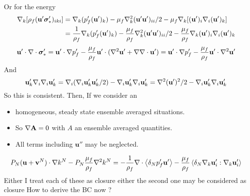 Or for the energy
\begin{align*}
    \mathbf{\nabla}_k [\rho_f (\textbf{u}' \bm\sigma_*')_{iki}]
    &=
    \mathbf{\nabla}_k (p_f'(\textbf{u}')_k  )
    - \mu_f \mathbf{\nabla}_k^2 (\textbf{u}'\textbf{u}')_{ii}/2
    - \mu_f\mathbf{\nabla}_k[ (\textbf{u}')_i \mathbf{\nabla}_i (\textbf{u}')_k]\\
    &=
    \frac{1}{\rho_f} \mathbf{\nabla}_k (p_f'(\textbf{u}')_k  )
    - \frac{\mu_f}{\rho_f}\mathbf{\nabla}_k^2 (\textbf{u}'\textbf{u}')_{ii}/2
    - \frac{\mu_f}{\rho_f}\mathbf{\nabla}_k (\textbf{u}')_i \mathbf{\nabla}_i (\textbf{u}')_k\\
\end{align*}
\begin{equation}
    \textbf{u}'\cdot\mathbf{\nabla}\cdot\bm\sigma'_*
    = 
    \textbf{u}'\cdot \mathbf{\nabla} p_f'
    - \frac{\mu_f}{\rho_f} \textbf{u}'\cdot (\mathbf{\nabla}^2 \textbf{u}' + \mathbf{\nabla}\mathbf{\nabla}\cdot \textbf{u}')
    =
    \textbf{u}'\cdot \mathbf{\nabla} p_f'
    - \frac{\mu_f}{\rho_f} \textbf{u}'\cdot \mathbf{\nabla}^2 \textbf{u}'
\end{equation}
And 
\begin{equation}
    \textbf{u}'_k \mathbf{\nabla}_i \mathbf{\nabla}_i \textbf{u}'_k
    =
   \mathbf{\nabla}_i ( \mathbf{\nabla}_i \textbf{u}'_k\textbf{u}'_k /2)
   - \mathbf{\nabla}_i \textbf{u}'_k \mathbf{\nabla}_i \textbf{u}'_k
   =
   \mathbf{\nabla}^2 (\textbf{u}')^2/2
   - \mathbf{\nabla}_i \textbf{u}'_k \mathbf{\nabla}_i \textbf{u}'_k
\end{equation}
So this is consistent. 
Then, 
If we consider an 
\begin{itemize}
    \item homogeneous, steady state ensemble averaged situations. 
    \item So $\mathbf{\nabla} \textbf{A} = 0$ with $A$ an ensemble averaged quantities. 
    \item All terms including $\textbf{u}''$ may be neglected. 
\end{itemize}

\begin{equation*}
    P_N(\textbf{u}+ \textbf{v}^N ) \cdot\mathbf{\nabla} k^N 
    -P_N \frac{\mu_f}{\rho_f} \mathbf{\nabla}^2k^N
    =
    -\frac{1}{\rho_f}\mathbf{\nabla}\cdot\left<\delta_N p_f'\textbf{u}'\right>
    -\frac{\mu_f}{\rho_f} \left<\delta_N \mathbf{\nabla}_k\textbf{u}'_i:\mathbf{\nabla}_k \textbf{u}'_i\right> 
\end{equation*}
Either I treat each of these as closure either the second one may be considered as closure
How to derive the BC now ? 
